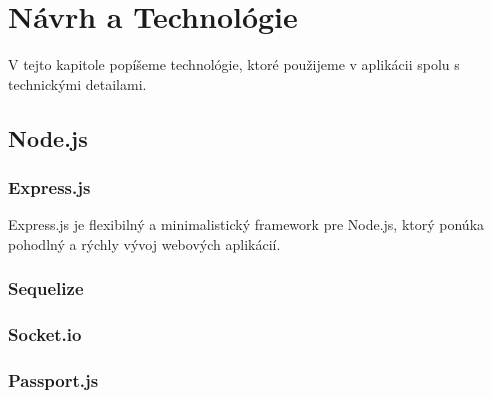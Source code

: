\chapter{Návrh a Technológie}
\label{kap:designtechnologies}

V tejto kapitole popíšeme technológie, ktoré použijeme v aplikácii spolu s technickými detailami.

\section{Node.js}

\subsection{Express.js}
Express.js je flexibilný a minimalistický framework
pre Node.js, ktorý ponúka pohodlný a rýchly vývoj webových aplikácií.

\subsection{Sequelize}

\subsection{Socket.io}

\subsection{Passport.js}
